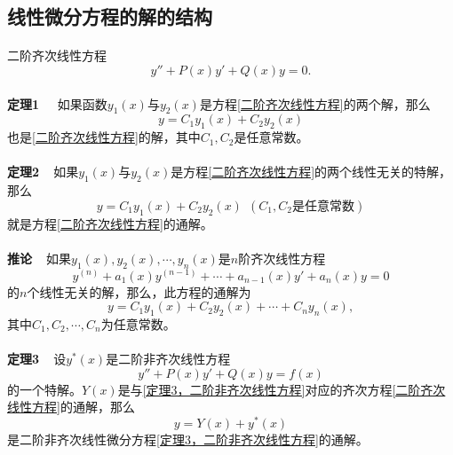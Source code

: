 \subsection{线性微分方程的解的结构}
\paragraph{}
二阶齐次线性方程
\begin{equation}
  \label{二阶齐次线性方程}
  y'' + P(x)y' + Q(x)y = 0.
\end{equation}

\paragraph{}
\textbf{定理1~~} 如果函数$y_1(x)$与$y_2(x)$是方程\eqref{二阶齐次线性方程}的两个解，那么
\begin{equation}
  y = C_1y_1(x) + C_2y_2(x)
\end{equation}
也是\eqref{二阶齐次线性方程}的解，其中$C_1, C_2$是任意常数。

\paragraph{}
\textbf{定理2~~}如果$y_1(x)$与$y_2(x)$是方程\eqref{二阶齐次线性方程}的两个线性无关的特解，那么
\begin{equation*}
  y = C_1y_1(x) + C_2y_2(x) ~~ (C_1, C_2\text{是任意常数})
\end{equation*}
就是方程\eqref{二阶齐次线性方程}的通解。

\paragraph{}
\textbf{推论~~}如果$y_1(x), y_2(x), \cdots, y_n(x)$是$n$阶齐次线性方程
\begin{equation*}
  y^{(n)}+a_1(x)y^{(n-1)}+\cdots+a_{n-1}(x)y' + a_n(x)y = 0
\end{equation*}
的$n$个线性无关的解，那么，此方程的通解为
\begin{equation*}
  y=C_1y_1(x) + C_2y_2(x) + \cdots + C_ny_n(x),
\end{equation*}
其中$C_1,C_2,\cdots,C_n$为任意常数。

\paragraph{}
\textbf{定理3~~}设$y^*(x)$是二阶非齐次线性方程
\begin{equation}
  \label{定理3，二阶非齐次线性方程}
  y''+P(x)y'+Q(x)y = f(x)
\end{equation}
的一个特解。$Y(x)$是与\eqref{定理3，二阶非齐次线性方程}对应的齐次方程\eqref{二阶齐次线性方程}的通解，那么
\begin{equation}
  y = Y(x) + y^*(x)
\end{equation}
是二阶非齐次线性微分方程\eqref{定理3，二阶非齐次线性方程}的通解。

